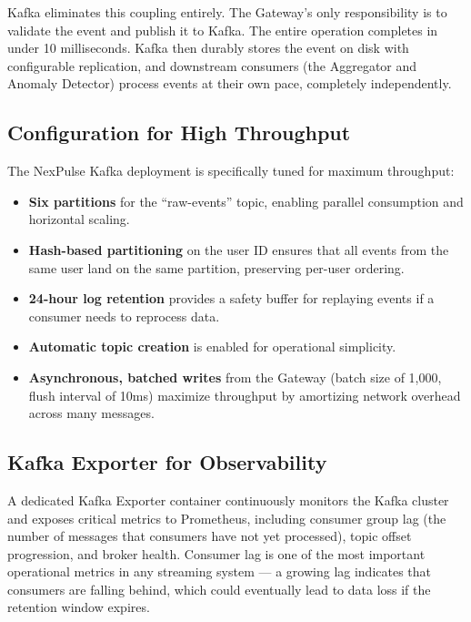 \documentclass[12pt,a4paper]{article}
\begin{document}
Kafka eliminates this coupling entirely. The Gateway's only responsibility is to validate the event and publish it to Kafka. The entire operation completes in under 10 milliseconds. Kafka then durably stores the event on disk with configurable replication, and downstream consumers (the Aggregator and Anomaly Detector) process events at their own pace, completely independently.

\subsection{Configuration for High Throughput}

The NexPulse Kafka deployment is specifically tuned for maximum throughput:

\begin{itemize}[leftmargin=2em]
    \item \textbf{Six partitions} for the ``raw-events'' topic, enabling parallel consumption and horizontal scaling.
    \item \textbf{Hash-based partitioning} on the user ID ensures that all events from the same user land on the same partition, preserving per-user ordering.
    \item \textbf{24-hour log retention} provides a safety buffer for replaying events if a consumer needs to reprocess data.
    \item \textbf{Automatic topic creation} is enabled for operational simplicity.
    \item \textbf{Asynchronous, batched writes} from the Gateway (batch size of 1,000, flush interval of 10ms) maximize throughput by amortizing network overhead across many messages.
\end{itemize}

\subsection{Kafka Exporter for Observability}

A dedicated Kafka Exporter container continuously monitors the Kafka cluster and exposes critical metrics to Prometheus, including consumer group lag (the number of messages that consumers have not yet processed), topic offset progression, and broker health. Consumer lag is one of the most important operational metrics in any streaming system --- a growing lag indicates that consumers are falling behind, which could eventually lead to data loss if the retention window expires.

\end{document}
